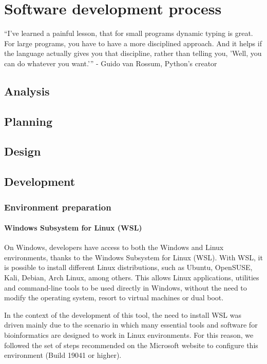 \chapter{Software development process}
\label{chapter:Analysis tool}

\begin{introduction}
    “I've learned a painful lesson, that for small programs dynamic typing is great. For large programs, you have to have a more disciplined approach. And it helps if the language actually gives you that discipline, rather than telling you, 'Well, you can do whatever you want.'” - Guido van Rossum, Python's creator
\end{introduction}

\section{Analysis}

\section{Planning}

\section{Design}


\section{Development}
\subsection{Environment preparation }
\subsubsection{\textbf{Windows Subsystem for Linux (WSL)}}

On Windows, developers have access to both the Windows and Linux environments, thanks to the Windows Subsystem for Linux (WSL). With WSL, it is possible to install different Linux distributions, such as Ubuntu, OpenSUSE, Kali, Debian, Arch Linux, among others. This allows Linux applications, utilities and command-line tools to be used directly in Windows, without the need to modify the operating system, resort to virtual machines or dual boot. 

In the context of the development of this tool, the need to install WSL was driven mainly due to the scenario in which many essential tools and software for bioinformatics are designed to work in Linux environments. For this reason, we followed the set of steps recommended on the Microsoft website to configure this environment (Build 19041 or higher). \cite{wsl}


